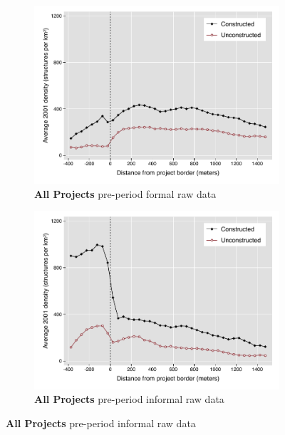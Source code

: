\documentclass[12pt]{article}
\begin{document}
\begin{figure}
        \centering
        \begin{subfigure}[b]{0.48\textwidth}
                    \caption[Network2]%
            {{\footnotesize \textbf{All Projects} pre-period formal raw data}}    
            \label{fig:prefor}
            \centering
            \includegraphics[width=\textwidth,trim={0.3cm .3cm 0.1cm 0cm}, clip=true]{figures/bblu_for_pre_means_4_30k.pdf}

        \end{subfigure}
        \hfill
        \begin{subfigure}[b]{0.48\textwidth}  
                    \caption[]%
            {{\footnotesize \textbf{All Projects} pre-period informal  raw data}}      
            \label{fig:preinf}
            \centering 
            \includegraphics[width=\textwidth,trim={0.3cm .3cm 0.1cm 0cm}, clip=true]{figures/bblu_inf_pre_means_4_30k.pdf}


\end{subfigure}
\end{figure}
\end{document}
